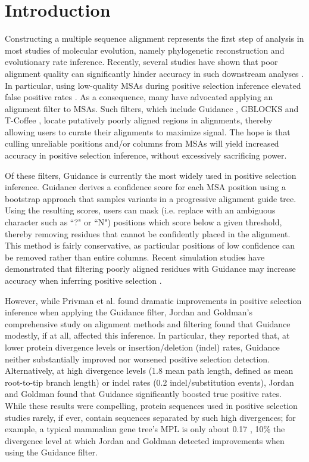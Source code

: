 \documentclass[10pt]{article}
\begin{document}
\section*{Introduction}
Constructing a multiple sequence alignment represents the first step of analysis in most studies of molecular evolution, namely phylogenetic reconstruction and evolutionary rate inference. Recently, several studies have shown that poor alignment quality can significantly hinder accuracy in such downstream analyses \citep{Jordan2011, MarkovaRaina2011, Dwivedi2009, Talavera2007, Ogden2006}. In particular, using low-quality MSAs during positive selection inference elevated false positive rates \citep{Privman2012, Schneider2009, Fletcher2010}. As a consequence, many have advocated applying an alignment filter to MSAs. Such filters, which include Guidance \citep{Penn2010, Privman2012}, GBLOCKS \citep{Castresana2000} and T-Coffee \citep{Notredame2000}, locate putatively poorly aligned regions in alignments, thereby allowing users to curate their alignments to maximize signal. The hope is that culling unreliable positions and/or columns from MSAs will yield increased accuracy in positive selection inference, without excessively sacrificing power.

Of these filters, Guidance \citep{Penn2010} is currently the most widely used in positive selection inference. Guidance derives a confidence score for each MSA position using a bootstrap approach that samples variants in a progressive alignment guide tree. Using the resulting scores, users can mask (i.e. replace with an ambiguous character such as ``?" or ``N") positions which score below a given threshold, thereby removing residues that cannot be confidently placed in the alignment. This method is fairly conservative, as particular positions of low confidence can be removed rather than entire columns. Recent simulation studies have demonstrated that filtering poorly aligned residues with Guidance may increase accuracy when inferring positive selection \citep{Jordan2011,Privman2012}. 

However, while Privman et al. \citet{Privman2012} found dramatic improvements in positive selection inference when applying the Guidance filter, Jordan and Goldman's \citet{Jordan2011} comprehensive study on alignment methods and filtering found that Guidance modestly, if at all, affected this inference. In particular, they reported that, at lower protein divergence levels or insertion/deletion (indel) rates, Guidance neither substantially improved nor worsened positive selection detection. Alternatively, at high divergence levels (1.8 mean path length, defined as mean root-to-tip branch length) or indel rates (0.2 indel/substitution events), Jordan and Goldman found that Guidance significantly boosted true positive rates. While these results were compelling, protein sequences used in positive selection studies rarely, if ever, contain sequences separated by such high divergences; for example, a typical mammalian gene tree's MPL is only about 0.17 \citep{Spielman2013}, 10\% the divergence level at which Jordan and Goldman detected improvements when using the Guidance filter.
\end{document}
